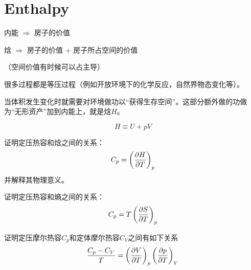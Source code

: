 \documentclass[CJK]{beamer}
\begin{document}
\section{Enthalpy}

\begin{frame}
\bch

内能 $\Rightarrow$ 房子的价值

\skipline

焓 $\Rightarrow$ 房子的价值 + 房子所占空间的价值



（空间价值有时候可以占主导）


\ech
\end{frame}

\begin{frame}
\bch


很多过程都是等压过程（例如开放环境下的化学反应，自然界物态变化等）。

\hspace{0.1in}

当体积发生变化时就需要对环境做功以“获得生存空间”。这部分额外做的功做为“无形资产”加到内能上，就是焓$H$。

$$ H  \equiv U + pV$$ 

\ech
\end{frame}



\begin{frame}
\bch
{}

证明定压热容和焓之间的关系：
{\blue
$$ C_p = \left(\frac{\partial H}{\partial T}\right)_{p} $$}
并解释其物理意义。
\ech
\end{frame}

\begin{frame}
\bch
{}

证明定压热容和熵之间的关系：
{\blue
$$ C_p = T\left(\frac{\partial S}{\partial T}\right)_{p} $$
}
\ech
\end{frame}


\begin{frame}
\bch


证明定压摩尔热容$C_p$和定体摩尔热容$C_V$之间有如下关系
{\blue
$$\frac{C_p-C_V}{T} =  \left(\frac{\partial V}{\partial T}\right)_{p} \left(\frac{\partial p}{\partial T}\right)_{V}$$
}

\ech
\end{frame}
\end{document}

